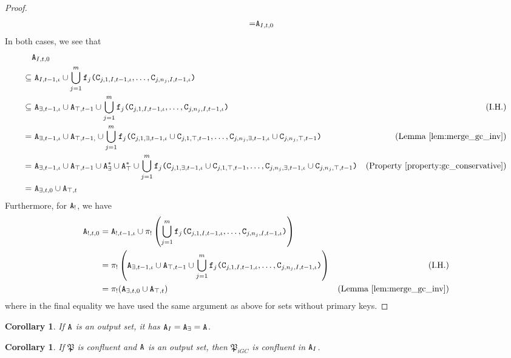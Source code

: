 \documentclass{article}
\numberwithin{equation}{section}
\newtheorem{cor}[theorem]{Corollary}
\renewcommand{\tt}[1]{\ifmmode\text{\texttt{#1}}\else\texttt{#1}\fi}
\begin{document}
\begin{proof}
\begin{align*}
=& \tt{A}_{I,t,0}
\end{align*}
In both cases, we see that
\begin{align*}
&\tt{A}_{I,t,0}\\
\subseteq&~ \tt{A}_{I,t-1,\iota} \cup \bigcup_{j=1}^m \tt{f}_j\tt{(}\tt{C}_{j,1,I,t-1,\iota}, \dots, \tt{C}_{j,n_j,I,t-1,\iota}\tt{)} \\
\subseteq&~ \tt{A}_{\exists,t-1,\iota} \cup \tt{A}_{\top,t-1} \cup \bigcup_{j=1}^m \tt{f}_j\tt{(}\tt{C}_{j,1,I,t-1,\iota}, \dots, \tt{C}_{j,n_j,I,t-1,\iota}\tt{)} & \text{(I.H.)} \\
=&~ \tt{A}_{\exists,t-1,\iota} \cup \tt{A}_{\top,t-1,} \cup \bigcup_{j=1}^m \tt{f}_j\tt{(}\tt{C}_{j,1,\exists,t-1,\iota} \cup \tt{C}_{j,1,\top,t-1}, \dots, \tt{C}_{j,n_j,\exists,t-1,\iota} \cup \tt{C}_{j,n_j,\top,t-1}\tt{)} & \text{(Lemma \ref{lem:merge_gc_inv})} \\
=&~ \tt{A}_{\exists,t-1,\iota} \cup \tt{A}_{\top,t-1} \cup \tt{A}_\exists^* \cup \tt{A}_\top^* \cup \bigcup_{j=1}^m \tt{f}_j\tt{(}\tt{C}_{j,1,\exists,t-1,\iota} \cup \tt{C}_{j,1,\top,t-1}, \dots, \tt{C}_{j,n_j,\exists,t-1,\iota} \cup \tt{C}_{j,n_j,\top,t-1}\tt{)} & \text{(Property \ref{property:gc_conservative})}\\
=&~ \tt{A}_{\exists,t,0} \cup \tt{A}_{\top,t}
\end{align*}
Furthermore, for $\tt{A}_!$, we have
\begin{align*}
\tt{A}_{!,t,0}
&= \tt{A}_{!,t-1,\iota} \cup \pi_!\left(\bigcup_{j=1}^m \tt{f}_j\tt{(}\tt{C}_{j,1,I,t-1,\iota}, \dots, \tt{C}_{j,n_j,I,t-1,\iota}\tt{)}\right)\\
&= \pi_!\left(\tt{A}_{\exists,t-1,\iota} \cup \tt{A}_{\top,t-1} \cup \bigcup_{j=1}^m \tt{f}_j\tt{(}\tt{C}_{j,1,I,t-1,\iota}, \dots, \tt{C}_{j,n_j,I,t-1,\iota}\tt{)}\right) & \text{(I.H.)} \\
&= \pi_!(\tt{A}_{\exists,t,0} \cup \tt{A}_{\top,t}) & \text{(Lemma \ref{lem:merge_gc_inv})}
\end{align*}
where in the final equality we have used the same argument as above for sets without primary keys.
\end{proof}

\begin{cor}
\label{cor:instantiated_equivalence_of_output}
If $\tt{A}$ is an output set, it has $\tt{A}_I = \tt{A}_\exists = \tt{A}$.
\end{cor}

\begin{cor}
\label{cor:instantiated_confluence_of_output}
If $\mathfrak{P}$ is confluent and $\tt{A}$ is an output set, then $\mathfrak{P}_{iGC}$ is confluent in $\tt{A}_I$.
\end{cor}
\end{document}
